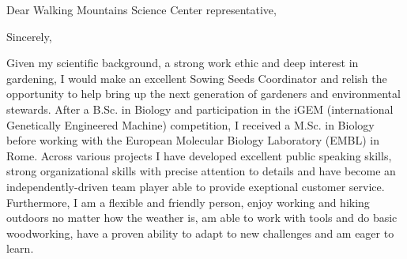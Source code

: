 \documentclass[11pt,a4paper,sans]{moderncv}
\begin{document}
\date{\today}
\opening{Dear Walking Mountains Science Center representative,}
\closing{Sincerely,}
\makelettertitle
\begin{spacing}{1.2}

Given my scientific background, a strong work ethic and deep interest in gardening, I would make an excellent Sowing Seeds Coordinator and relish the opportunity to help bring up the next generation of gardeners and environmental stewards. After a B.Sc. in Biology and participation in the iGEM (international Genetically Engineered Machine) competition, I received a M.Sc. in Biology before working with the European Molecular Biology Laboratory (EMBL) in Rome. Across various projects I have developed excellent public speaking skills, strong organizational skills with precise attention to details and have become an independently-driven team player able to provide exeptional customer service. Furthermore, I am a flexible and friendly person, enjoy working and hiking outdoors no matter how the weather is, am able to work with tools and do basic woodworking, have a proven ability to adapt to new challenges and am eager to learn.\par%


\end{spacing}
\end{document}

